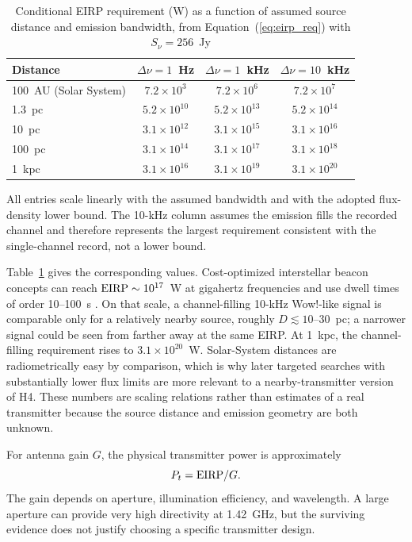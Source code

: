 \documentclass[crop]{CSL}
\newcommand{\snu}{S_\nu}
\begin{document}
\begin{table}[ht!]
\centering
\caption{Conditional EIRP requirement (W) as a function of assumed source distance and emission bandwidth, from Equation~(\ref{eq:eirp_req}) with $\snu=256$~Jy}
\label{tab:eirp}
\begin{tabular}{lccc}
\hline Distance & $\Delta\nu=1$~Hz & $\Delta\nu=1$~kHz & $\Delta\nu=10$~kHz \\ \hline\hline
100~AU (Solar System) & $7.2\times10^{3}$ & $7.2\times10^{6}$ & $7.2\times10^{7}$ \\
1.3~pc & $5.2\times10^{10}$ & $5.2\times10^{13}$ & $5.2\times10^{14}$ \\
10~pc & $3.1\times10^{12}$ & $3.1\times10^{15}$ & $3.1\times10^{16}$ \\
100~pc & $3.1\times10^{14}$ & $3.1\times10^{17}$ & $3.1\times10^{18}$ \\
1~kpc & $3.1\times10^{16}$ & $3.1\times10^{19}$ & $3.1\times10^{20}$ \\
\end{tabular}

\par {\small All entries scale linearly with the assumed bandwidth and with the adopted flux-density lower bound. The 10-kHz column assumes the emission fills the recorded channel and therefore represents the largest requirement consistent with the single-channel record, not a lower bound.}
\end{table}

Table~\ref{tab:eirp} gives the corresponding values. Cost-optimized interstellar beacon concepts can reach ${\rm EIRP}\sim10^{17}$~W at gigahertz frequencies and use dwell times of order 10--100~s \citep{benford2010,benford2021}. On that scale, a channel-filling 10-kHz Wow!-like signal is comparable only for a relatively nearby source, roughly $D\lesssim10$--30~pc; a narrower signal could be seen from farther away at the same EIRP. At 1~kpc, the channel-filling requirement rises to $3.1\times10^{20}$~W. Solar-System distances are radiometrically easy by comparison, which is why later targeted searches with substantially lower flux limits \citep[e.g.][]{perez2022} are more relevant to a nearby-transmitter version of H4. These numbers are scaling relations rather than estimates of a real transmitter because the source distance and emission geometry are both unknown.

For antenna gain $G$, the physical transmitter power is approximately
\[
P_t={\rm EIRP}/G.
\]
The gain depends on aperture, illumination efficiency, and wavelength. A large aperture can provide very high directivity at 1.42~GHz, but the surviving evidence does not justify choosing a specific transmitter design.
\end{document}
